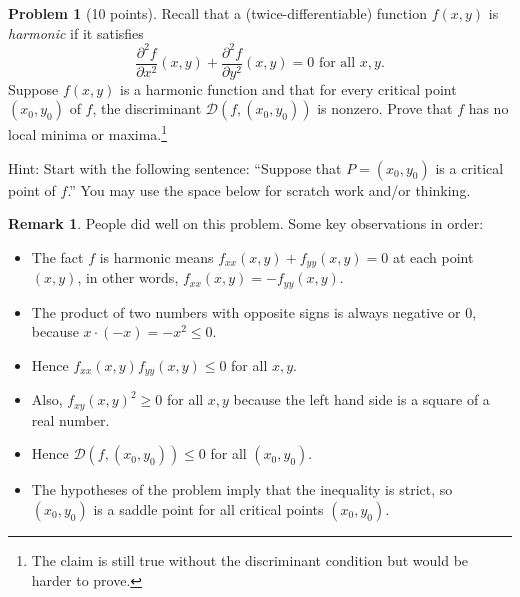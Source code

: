 \documentclass[11pt,oneside]{amsart}
\theoremstyle{definition}
\newtheorem{problem}{Problem}
\newtheorem*{remark}{Remark}
\theoremstyle{plain}
\begin{document}
\newpage

\begin{problem}[10 points]
  Recall that a (twice-differentiable) function $f(x,y)$ is \emph{harmonic} if it satisfies
  \[\frac{\partial^2 f}{\partial x^2}(x,y)+\frac{\partial^2 f}{\partial y^2}(x,y)=0\text{ for all }x,y.\]
  Suppose $f(x,y)$ is a harmonic function and that for every critical point $(x_0,y_0)$ of $f$, the discriminant $\mathcal D(f,(x_0,y_0))$ is nonzero. Prove that $f$ has no local minima or maxima.\footnote{The claim is still true without the discriminant condition but would be harder to prove.}

  Hint: Start with the following sentence: ``Suppose that $P=(x_0,y_0)$ is a critical point of $f$.'' You may use the space below for scratch work and/or thinking.
\end{problem}
\begin{remark}\color{blue}
  People did well on this problem. Some key observations in order:
  \begin{itemize}
    \item The fact $f$ is harmonic means $f_{xx}(x,y)+f_{yy}(x,y)=0$ at each point $(x,y)$, in other words, $f_{xx}(x,y)=-f_{yy}(x,y)$.
    \item The product of two numbers with opposite signs is always negative or 0, because $x\cdot(-x)=-x^2\leq 0$.
    \item Hence $f_{xx}(x,y)f_{yy}(x,y)\leq 0$ for all $x,y$.
    \item Also, $f_{xy}(x,y)^2\geq 0$ for all $x,y$ because the left hand side is a square of a real number.
    \item Hence $\mathcal D(f,(x_0,y_0))\leq 0$ for all $(x_0,y_0)$.
    \item The hypotheses of the problem imply that the inequality is strict, so $(x_0,y_0)$ is a saddle point for all critical points $(x_0,y_0)$.
  \end{itemize}
\end{remark}
\end{document}
